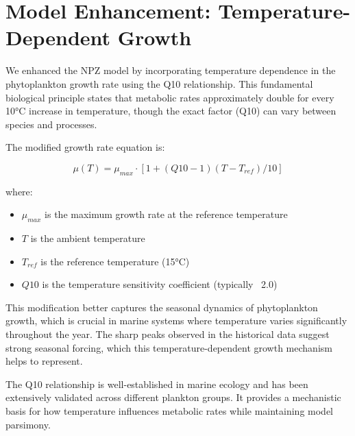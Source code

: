 \section{Model Enhancement: Temperature-Dependent Growth}

We enhanced the NPZ model by incorporating temperature dependence in the phytoplankton growth rate using the Q10 relationship. This fundamental biological principle states that metabolic rates approximately double for every 10°C increase in temperature, though the exact factor (Q10) can vary between species and processes.

The modified growth rate equation is:

\[ \mu(T) = \mu_{max} \cdot [1 + (Q10-1)(T-T_{ref})/10] \]

where:
\begin{itemize}
\item $\mu_{max}$ is the maximum growth rate at the reference temperature
\item $T$ is the ambient temperature
\item $T_{ref}$ is the reference temperature (15°C)
\item $Q10$ is the temperature sensitivity coefficient (typically ~2.0)
\end{itemize}

This modification better captures the seasonal dynamics of phytoplankton growth, which is crucial in marine systems where temperature varies significantly throughout the year. The sharp peaks observed in the historical data suggest strong seasonal forcing, which this temperature-dependent growth mechanism helps to represent.

The Q10 relationship is well-established in marine ecology and has been extensively validated across different plankton groups. It provides a mechanistic basis for how temperature influences metabolic rates while maintaining model parsimony.
